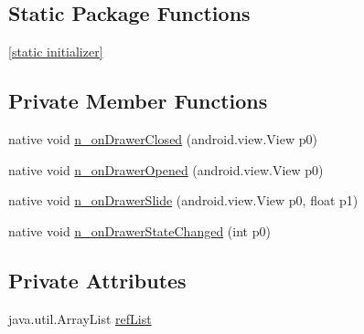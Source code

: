 \subsection*{Static Package Functions}
\begin{CompactItemize}
\item 
\hyperlink{classmono_1_1android_1_1support_1_1v4_1_1widget_1_1_drawer_layout___drawer_listener_implementor_dca4b8cdd3dc573e060f15f8b3cabcb2}{\mbox{[}static initializer\mbox{]}}
\end{CompactItemize}
\subsection*{Private Member Functions}
\begin{CompactItemize}
\item 
native void \hyperlink{classmono_1_1android_1_1support_1_1v4_1_1widget_1_1_drawer_layout___drawer_listener_implementor_9fd1a5bf520a76a70147551143d68a1b}{n\_\-onDrawerClosed} (android.view.View p0)
\item 
native void \hyperlink{classmono_1_1android_1_1support_1_1v4_1_1widget_1_1_drawer_layout___drawer_listener_implementor_a220434469e1ccdc812af11b8e0b7521}{n\_\-onDrawerOpened} (android.view.View p0)
\item 
native void \hyperlink{classmono_1_1android_1_1support_1_1v4_1_1widget_1_1_drawer_layout___drawer_listener_implementor_fce486108a7a1ee2ec48cfa07d75f871}{n\_\-onDrawerSlide} (android.view.View p0, float p1)
\item 
native void \hyperlink{classmono_1_1android_1_1support_1_1v4_1_1widget_1_1_drawer_layout___drawer_listener_implementor_28931883934a45420c5e6be2137793a8}{n\_\-onDrawerStateChanged} (int p0)
\end{CompactItemize}
\subsection*{Private Attributes}
\begin{CompactItemize}
\item 
java.util.ArrayList \hyperlink{classmono_1_1android_1_1support_1_1v4_1_1widget_1_1_drawer_layout___drawer_listener_implementor_1cf2af08cab7def400914e1842c729de}{refList}
\end{CompactItemize}


